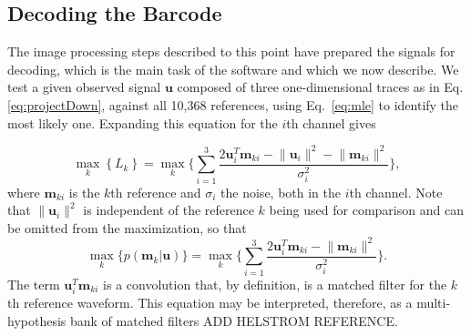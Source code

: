 \subsection{Decoding the Barcode}
The image processing steps described to this point have prepared the signals for decoding, which is the main task of the software and which we now describe.  We test a given observed signal $\mathbf{u}$ composed of three one-dimensional traces as in Eq. 
\ref{eq:projectDown}, against all 10,368 references, using Eq.~\ref{eq:mle} to identify the most likely one. Expanding this equation for the $i$th channel gives

\begin{equation}
\max_k   \left\{ L_k \right\} =  \max_k  \Bigg\{ \sum_{i=1}^3  \frac{  2 \mathbf{u}_i ^T \mathbf{m}_{ki} - \lVert \mathbf{u}_i \rVert^2  - \lVert \mathbf{m}_{ki} \rVert^2   }{\sigma_i^2}  \Bigg\}, 
\end{equation}
where $\mathbf{m}_{ki}$  is the $k$th reference and $\sigma_i$ the noise, both in the $i$th channel. Note that $\lVert \mathbf{u}_i \rVert^2$  is independent of the reference $k$ being used for comparison and can be omitted from the maximization, so that
\begin{equation}
\max_k   \big\{  p(\mathbf{m}_k|\mathbf{u}) \big\} =  \max_k  \Bigg\{ \sum_{i=1}^3  \frac{  2 \mathbf{u}_i ^T \mathbf{m}_{ki}  - \lVert \mathbf{m}_{ki} \rVert^2   }{\sigma_i^2}  \Bigg\}. 
\end{equation}
The term $\mathbf{u}_i ^T \mathbf{m}_{ki}$ is a convolution that, by definition, is a matched filter for the $k$th reference waveform. This equation may be interpreted, therefore, as a multi-hypothesis bank of matched filters ADD HELSTROM REFERENCE.

